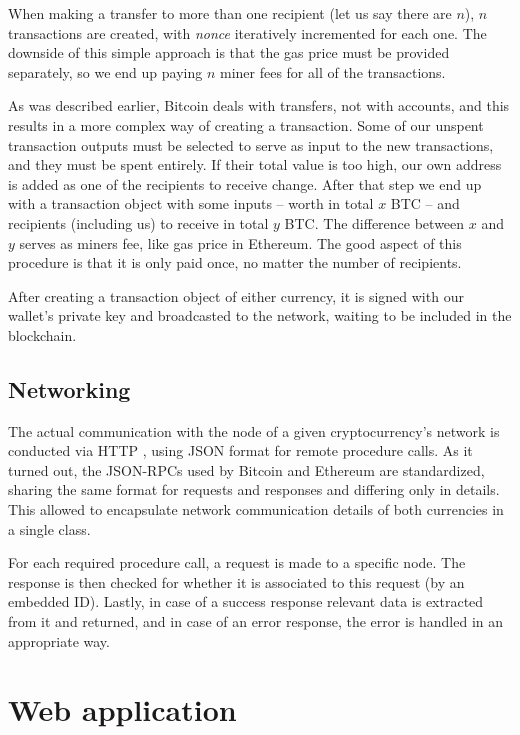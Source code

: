 When making a transfer to more than one recipient (let us say there are $n$),
$n$ transactions are created, with \textit{nonce} iteratively incremented for each one.
The downside of this simple approach is that the gas price must be provided separately,
so we end up paying $n$ miner fees for all of the transactions.

As was described earlier, Bitcoin deals with transfers, not with accounts,
and this results in a more complex way of creating a transaction.
Some of our unspent transaction outputs must be selected to serve as input to the new transactions,
and they must be spent entirely.
If their total value is too high,
our own address is added as one of the recipients to receive change.
After that step we end up with a transaction object with some inputs
-- worth in total $x$ BTC
-- and recipients (including us) to receive in total $y$ BTC.
The difference between $x$ and $y$ serves as miners fee, like gas price in Ethereum.
The good aspect of this procedure is that it is only paid once,
no matter the number of recipients.

After creating a transaction object of either currency,
it is signed with our wallet's private key and broadcasted to the network,
waiting to be included in the blockchain.

\subsection{Networking}

The actual communication with the node of a given cryptocurrency's network is conducted via HTTP \cite{http},
using JSON \cite{http} format for remote procedure calls.
As it turned out, the JSON-RPCs \cite{json-rpc} used by Bitcoin and Ethereum are standardized,
sharing the same format for requests and responses and differing only in details.
This allowed to encapsulate network communication details of both currencies in a single class.

For each required procedure call, a request is made to a specific node.
The response is then checked for whether it is associated to this request (by an embedded ID).
Lastly, in case of a success response relevant data is extracted from it and returned,
and in case of an error response, the error is handled in an appropriate way.

\section{Web application}


